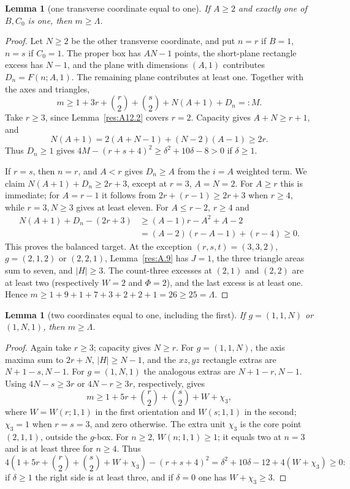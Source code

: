 \documentclass[11pt]{article}
\newtheorem{lemma}[theorem]{Lemma}
\theoremstyle{definition}
\theoremstyle{remark}
\theoremstyle{plain}
\begin{document}
\begin{lemma}[one transverse coordinate equal to one]\label{res:A12.5}
If $A\ge2$ and exactly one of $B,C_0$ is one, then $m\ge \Lambda$.
\end{lemma}
\begin{proof}
Let $N\ge2$ be the other transverse coordinate, and put $n=r$ if
$B=1$, $n=s$ if $C_0=1$.  The proper box has $AN-1$ points,
the short-plane rectangle excess has $N-1$, and the plane with
dimensions $(A,1)$ contributes $D_n=F(n;A,1)$.  The remaining plane
contributes at least one.  Together with the axes and triangles,
\[
 m\ge1+3r+\binom r2+\binom s2+N(A+1)+D_n=:M.\tag{3.11}\label{eq:capacity-11}
\]
Take $r\ge3$, since Lemma~\ref{res:A12.2} covers $r=2$.
Capacity gives $A+N\ge r+1$, and
\[
 N(A+1)=2(A+N-1)+(N-2)(A-1)\ge2r.
\]
Thus $D_n\ge1$ gives
$4M-(r+s+4)^2\ge\delta^2+10\delta-8>0$ if $\delta\ge1$.

If $r=s$, then $n=r$, and $A<r$ gives $D_n\ge A$ from the $i=A$
weighted term.  We claim $N(A+1)+D_n\ge2r+3$, except at $r=3$,
$A=N=2$.  For $A\ge r$ this is immediate; for $A=r-1$ it follows
from $2r+(r-1)\ge2r+3$ when $r\ge4$, while $r=3,N\ge3$ gives
at least eleven.  For $A\le r-2$, $r\ge4$ and
\[
\begin{split}
 N(A+1)+D_n-(2r+3)
 &\ge(A-1)r-A^2+A-2\\
 &=(A-2)(r-A-1)+(r-4)\ge0.
\end{split}
\]
This proves the balanced target.  At the exception
$(r,s,t)=(3,3,2)$, $g=(2,1,2)$ or $(2,2,1)$, Lemma~\ref{res:A.9} has $J=1$,
the three triangle areas sum to seven, and $|H|\ge3$.
The count-three excesses at $(2,1)$ and $(2,2)$ are at least two
(respectively $W=2$ and $\Phi=2$), and the last excess is at least one.
Hence $m\ge1+9+1+7+3+2+2+1=26\ge25=\Lambda$.
\end{proof}

\begin{lemma}[two coordinates equal to one, including the first]\label{res:A12.6}
If $g=(1,1,N)$ or $(1,N,1)$, then $m\ge \Lambda$.
\end{lemma}
\begin{proof}
Again take $r\ge3$; capacity gives $N\ge r$.
For $g=(1,1,N)$, the axis maxima sum to $2r+N$,
$|H|\ge N-1$, and the $xz,yz$ rectangle extras are
$N+1-s,N-1$.  For $g=(1,N,1)$ the analogous extras are
$N+1-r,N-1$.  Using $4N-s\ge3r$ or $4N-r\ge3r$, respectively,
gives
\[
 m\ge1+5r+\binom r2+\binom s2+W+\chi_3,\tag{3.12}\label{eq:capacity-12}
\]
where $W=W(r;1,1)$ in the first orientation and $W(s;1,1)$ in the
second; $\chi_3=1$ when $r=s=3$, and zero otherwise.
The extra unit $\chi_3$ is the core point $(2,1,1)$, outside the $g$-box.
For $n\ge2$, $W(n;1,1)\ge1$; it equals two at $n=3$ and is at least
three for $n\ge4$.  Thus
\[
 4\left(1+5r+\binom r2+\binom s2+W+\chi_3\right)-(r+s+4)^2
 =\delta^2+10\delta-12+4(W+\chi_3)\ge0:
\]
if $\delta\ge1$ the right side is at least three, and if $\delta=0$
one has $W+\chi_3\ge3$. \end{proof}
\end{document}
